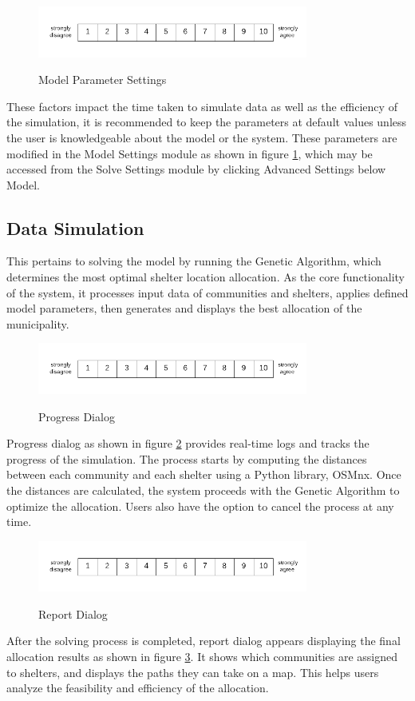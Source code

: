 	\begin{figure}[h!]
		\caption{Model Parameter Settings}
		\centering
		\includegraphics[width=3.5in]{Nrs-10}
		\label{modelSet}
	\end{figure}
	These factors impact the time taken to simulate data as well as the efficiency of the simulation, it is recommended to keep the parameters at default values unless the user is knowledgeable about the model or the system. These parameters are modified in the Model Settings module as shown in figure \ref{modelSet}, which may be accessed from the Solve Settings module by clicking Advanced Settings below Model.
	
	
\subsection{Data Simulation}
	This pertains to solving the model by running the Genetic Algorithm, which determines the most optimal shelter location allocation. As the core functionality of the system, it processes input data of communities and shelters, applies defined model parameters, then generates and displays the best allocation of the municipality.
	
	\begin{figure}[h!]
		\caption{Progress Dialog}
		\centering
		\includegraphics[width=3.5in]{Nrs-10}
		\label{solveProg}
	\end{figure}
	Progress dialog as shown in figure \ref{solveProg} provides real-time logs and tracks the progress of the simulation. The process starts by computing the distances between each community and each shelter using a Python library, OSMnx. Once the distances are calculated, the system proceeds with the Genetic Algorithm to optimize the allocation. Users also have the option to cancel the process at any time.
	
	\begin{figure}[h!]
		\caption{Report Dialog}
		\centering
		\includegraphics[width=3.5in]{Nrs-10}
		\label{shelAllocRep}
	\end{figure}
	After the solving process is completed, report dialog appears displaying the final allocation results as shown in figure \ref{shelAllocRep}. It shows which communities are assigned to shelters, and displays the paths they can take on a map. This helps users analyze the feasibility and efficiency of the allocation.
	
